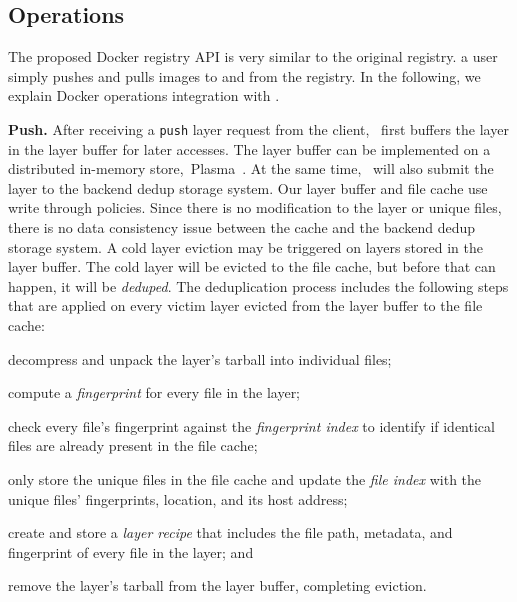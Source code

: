 \subsection{Operations}
\label{sec:design_operations}

%
The proposed Docker registry API is very similar to the original registry.
a user simply pushes and pulls images to and from the registry. 
In the following, we explain Docker operations integration with \sysname.


\textbf{Push.}
After receiving a \texttt{push} layer request from the client, 
\sysname~first buffers the layer in the layer buffer for later accesses. 
The layer buffer can be implemented on a distributed in-memory store,~\eg Plasma~\cite{plasma}.
At the same time, \sysname~will also submit the layer to the backend dedup storage system.
Our layer buffer and file cache use write through policies. 
Since there is no modification to the layer or unique files, 
there is no data consistency issue between the cache and the backend dedup storage system.
A cold layer eviction may be triggered on layers stored in the layer buffer.
The cold layer will be evicted to the file cache, but before that can happen, it will be \emph{deduped}.
The deduplication process includes the following steps 
that are applied on every victim layer evicted from the layer buffer to the file cache:

\begin{compactenumerate}
	\item decompress and unpack the layer's tarball into individual files;
	\item compute a \emph{fingerprint} for every file in the layer;
	\item check every file's fingerprint against the \emph{fingerprint index} to
	identify if identical files are already present in the file cache;
	\item only store the unique files in the file cache and update the 
	\emph{file index} with the unique files' fingerprints, location, and its host address;
	\item create and store a \emph{layer recipe} that includes the file path,
	metadata, and fingerprint of every file in the layer; and
	\item remove the layer's tarball from the layer buffer, completing eviction.
\end{compactenumerate}

